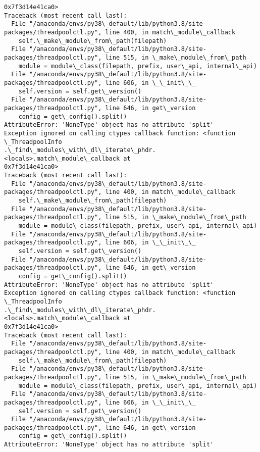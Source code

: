 \documentclass[11pt]{article}
\begin{document}
\begin{Verbatim}[commandchars=\\\{\}]
0x7f3d14e41ca0>
Traceback (most recent call last):
  File "/anaconda/envs/py38\_default/lib/python3.8/site-
packages/threadpoolctl.py", line 400, in match\_module\_callback
    self.\_make\_module\_from\_path(filepath)
  File "/anaconda/envs/py38\_default/lib/python3.8/site-
packages/threadpoolctl.py", line 515, in \_make\_module\_from\_path
    module = module\_class(filepath, prefix, user\_api, internal\_api)
  File "/anaconda/envs/py38\_default/lib/python3.8/site-
packages/threadpoolctl.py", line 606, in \_\_init\_\_
    self.version = self.get\_version()
  File "/anaconda/envs/py38\_default/lib/python3.8/site-
packages/threadpoolctl.py", line 646, in get\_version
    config = get\_config().split()
AttributeError: 'NoneType' object has no attribute 'split'
Exception ignored on calling ctypes callback function: <function \_ThreadpoolInfo
.\_find\_modules\_with\_dl\_iterate\_phdr.<locals>.match\_module\_callback at
0x7f3d14e41ca0>
Traceback (most recent call last):
  File "/anaconda/envs/py38\_default/lib/python3.8/site-
packages/threadpoolctl.py", line 400, in match\_module\_callback
    self.\_make\_module\_from\_path(filepath)
  File "/anaconda/envs/py38\_default/lib/python3.8/site-
packages/threadpoolctl.py", line 515, in \_make\_module\_from\_path
    module = module\_class(filepath, prefix, user\_api, internal\_api)
  File "/anaconda/envs/py38\_default/lib/python3.8/site-
packages/threadpoolctl.py", line 606, in \_\_init\_\_
    self.version = self.get\_version()
  File "/anaconda/envs/py38\_default/lib/python3.8/site-
packages/threadpoolctl.py", line 646, in get\_version
    config = get\_config().split()
AttributeError: 'NoneType' object has no attribute 'split'
Exception ignored on calling ctypes callback function: <function \_ThreadpoolInfo
.\_find\_modules\_with\_dl\_iterate\_phdr.<locals>.match\_module\_callback at
0x7f3d14e41ca0>
Traceback (most recent call last):
  File "/anaconda/envs/py38\_default/lib/python3.8/site-
packages/threadpoolctl.py", line 400, in match\_module\_callback
    self.\_make\_module\_from\_path(filepath)
  File "/anaconda/envs/py38\_default/lib/python3.8/site-
packages/threadpoolctl.py", line 515, in \_make\_module\_from\_path
    module = module\_class(filepath, prefix, user\_api, internal\_api)
  File "/anaconda/envs/py38\_default/lib/python3.8/site-
packages/threadpoolctl.py", line 606, in \_\_init\_\_
    self.version = self.get\_version()
  File "/anaconda/envs/py38\_default/lib/python3.8/site-
packages/threadpoolctl.py", line 646, in get\_version
    config = get\_config().split()
AttributeError: 'NoneType' object has no attribute 'split'

\end{Verbatim}
\end{document}
